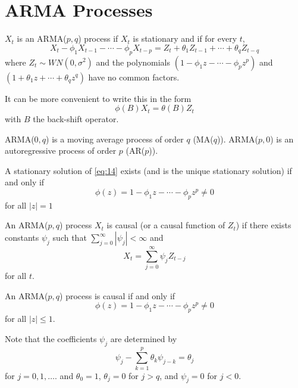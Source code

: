 
\section{ARMA Processes}
\label{sec:arma-processes}

\begin{defn}
  \label{defn:arma_processes:1}
  $X_{t}$ is an ARMA($p, q$) process if $X_{t}$ is stationary and if
  for every $t$,
  \begin{equation}
    \label{eq:14}
    X_{t} - \phi_{1} X_{t-1} - \cdots - \phi_{p} X_{t-p} = Z_{t} +
    \theta_{1} Z_{t-1} + \cdots + \theta_{q} Z_{t-q}
  \end{equation} where $Z_{t} \sim WN(0, \sigma^{2})$  and the
  polynomials $(1 - \phi_{1}z - \cdots - \phi_{p} z^{p})$ and $(1 +
  \theta_{1} z + \cdots + \theta_{q} z^{q})$ have no common factors.

  It can be more convenient to write this in the form
  \begin{equation}
    \label{eq:19}
    \phi(B) X_{t} = \theta(B) Z_{t}
  \end{equation}
  with $B$ the back-shift operator.

  ARMA($0, q$) is a moving average process of order $q$ (MA($q$)).
  ARMA($p, 0$) is an autoregressive process of order $p$ (AR($p$)).
\end{defn}

\begin{thm}
  \label{defn:arma_processes:2}
  A stationary solution of \eqref{eq:14} exists (and is the unique
  stationary solution) if and only if
  \begin{equation}
    \label{eq:20}
    \phi(z) = 1 - \phi_{1} z - \cdots - \phi_{p} z^{p} \neq 0
  \end{equation} for all $|z| = 1$
\end{thm}

\begin{defn}
  \label{defn:arma_processes:3}
  An ARMA($p, q$) process $X_{t}$ is causal (or a causal function of
  $Z_{t}$) if there exists constants $\psi_{j}$ such that
  $\sum_{j=0}^{\infty} |\psi_{j}| < \infty$ and
  \begin{equation}
    \label{eq:21}
    X_{t} = \sum_{j=0}^{\infty} \psi_{j} Z_{t-j}
  \end{equation} for all $t$.
\end{defn}

\begin{thm}
  \label{defn:arma_processes:4}
  An ARMA($p, q$) process is causal if and only if
  \begin{equation}
    \label{eq:22}
    \phi(z) = 1 - \phi_{1} z - \cdots - \phi_{p} z^{p} \neq 0
  \end{equation} for all $|z| \leq 1$.

  Note that the coefficients $\psi_{j}$ are determined by
  \begin{equation}
    \label{eq:25}
    \psi_{j} - \sum_{k=1}^{p} \theta_{k} \psi_{j-k} = \theta_{j}
  \end{equation} for $j = 0, 1, \dots$.
  and $\theta_{0} = 1$, $\theta_{j} = 0$ for $j > q$, and $\psi_{j} =
  0$ for $j < 0$.
\end{thm}

